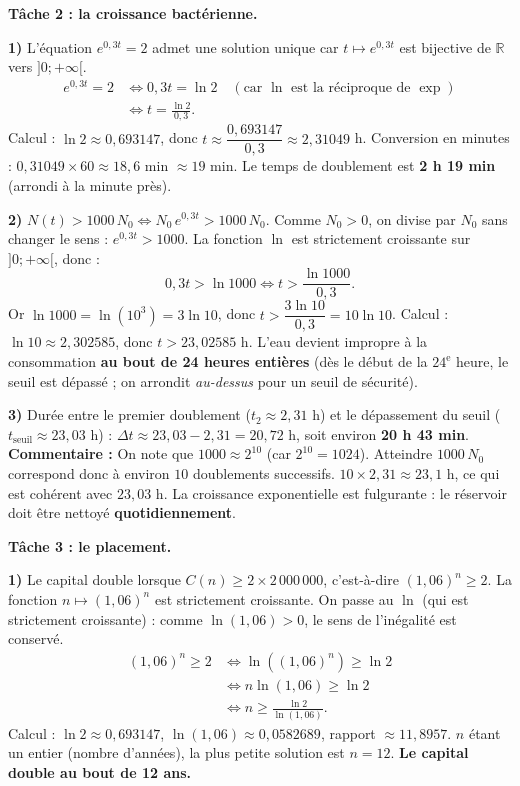 \documentclass[11pt]{article}
\begin{document}
\begin{exoresolu}
\textbf{Tâche 2 : la croissance bactérienne.}

\textbf{1)} L'équation $e^{0{,}3t} = 2$ admet une solution unique car $t \mapsto e^{0{,}3t}$ est bijective de $\mathbb{R}$ vers $]0;+\infty[$.
\begin{align*}
e^{0{,}3t} = 2 &\iff 0{,}3t = \ln 2 \quad (\text{car } \ln \text{ est la réciproque de } \exp) \\
&\iff t = \frac{\ln 2}{0{,}3}.
\end{align*}
Calcul : $\ln 2 \approx 0{,}693147$, donc $t \approx \dfrac{0{,}693147}{0{,}3} \approx 2{,}31049$ h.
Conversion en minutes : $0{,}31049 \times 60 \approx 18{,}6$ min $\approx 19$ min.
Le temps de doublement est \textbf{2 h 19 min} (arrondi à la minute près).

\textbf{2)} $N(t) > 1000\,N_0 \iff N_0\,e^{0{,}3t} > 1000\,N_0$.
Comme $N_0 > 0$, on divise par $N_0$ sans changer le sens : $e^{0{,}3t} > 1000$.
La fonction $\ln$ est strictement croissante sur $]0;+\infty[$, donc :
\[ 0{,}3t > \ln 1000 \iff t > \frac{\ln 1000}{0{,}3}. \]
Or $\ln 1000 = \ln(10^3) = 3\ln 10$, donc $t > \dfrac{3\ln 10}{0{,}3} = 10\ln 10$.
Calcul : $\ln 10 \approx 2{,}302585$, donc $t > 23{,}02585$ h.
L'eau devient impropre à la consommation \textbf{au bout de 24 heures entières} (dès le début de la $24^{\text{e}}$ heure, le seuil est dépassé ; on arrondit \emph{au-dessus} pour un seuil de sécurité).

\textbf{3)} Durée entre le premier doublement ($t_2 \approx 2{,}31$ h) et le dépassement du seuil ($t_{\text{seuil}} \approx 23{,}03$ h) :
$\Delta t \approx 23{,}03 - 2{,}31 = 20{,}72$ h, soit environ \textbf{20 h 43 min}.
\textbf{Commentaire :} On note que $1000 \approx 2^{10}$ (car $2^{10} = 1024$). Atteindre $1000\,N_0$ correspond donc à environ $10$ doublements successifs. $10 \times 2{,}31 \approx 23{,}1$ h, ce qui est cohérent avec $23{,}03$ h. La croissance exponentielle est fulgurante : le réservoir doit être nettoyé \textbf{quotidiennement}.

\textbf{Tâche 3 : le placement.}

\textbf{1)} Le capital double lorsque $C(n) \geq 2 \times 2\,000\,000$, c'est-à-dire $(1{,}06)^n \geq 2$.
La fonction $n \mapsto (1{,}06)^n$ est strictement croissante. On passe au $\ln$ (qui est strictement croissante) : comme $\ln(1{,}06) > 0$, le sens de l'inégalité est conservé.
\begin{align*}
(1{,}06)^n \geq 2 &\iff \ln\left((1{,}06)^n\right) \geq \ln 2 \\
&\iff n\ln(1{,}06) \geq \ln 2 \\
&\iff n \geq \frac{\ln 2}{\ln(1{,}06)}.
\end{align*}
Calcul : $\ln 2 \approx 0{,}693147$, $\ln(1{,}06) \approx 0{,}0582689$, rapport $\approx 11{,}8957$.
$n$ étant un entier (nombre d'années), la plus petite solution est $n = 12$.
\textbf{Le capital double au bout de 12 ans.}


\end{exoresolu}
\end{document}
